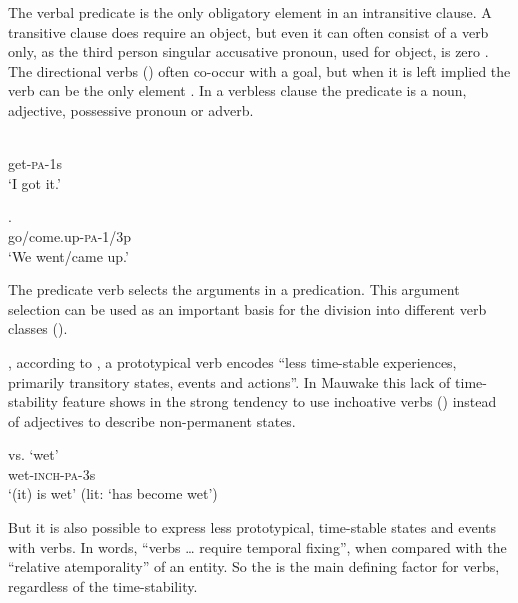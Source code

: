 The verbal predicate is the only obligatory element in an intransitive clause. A transitive clause does require an object, but even it can often consist of a verb only, as the third person singular accusative pronoun, used for object, is zero . The directional verbs () often co-occur with a goal, but when it is left implied the verb can be the only element . In a verbless clause the predicate is a noun, adjective, possessive pronoun or adverb. 

\ea%
\label{ex:3:x177}
\gll {} \\
get-\textsc{pa}-1s\\
\glt`I got it.'
\z

\ea%
\label{ex:3:x178}
\gll {}. \\
go/come.up-\textsc{pa}-1/3p \\
\glt`We went/came up.' 
\z

The predicate verb selects the arguments in a predication. This argument selection can be used as an important basis for the division into different verb classes ().

, according to \citet[64]{Givon}, a prototypical verb encodes ``{less time-stable experiences, primarily transitory states, events and actions}''. In Mauwake this lack of time-stability feature shows in the strong tendency to use inchoative verbs  () instead of adjectives to describe non-permanent states. 

\ea%
\label{ex:3:x179}
\gll {} vs.  `wet' \\
wet-\textsc{inch}-\textsc{pa}-3s \\
\glt`(it) is wet' (lit: `has become wet') 
\z

But it is also possible to express less prototypical, time-stable states and events with verbs. In  words, ``{verbs {\dots} require temporal fixing''}, when compared with the ``{relative atemporality}'' of an entity. So the  is the main defining factor for verbs, regardless of the time-stability.

